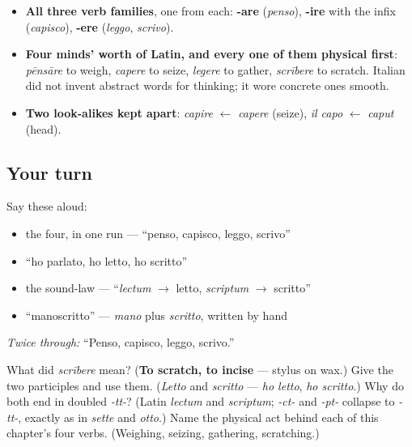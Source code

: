 \begin{grammarlens}[title={What you've built this chapter}]
\begin{itemize}
\raggedright
  \item \textbf{All three verb families}, one from each: \textbf{-are} (\emph{penso}), \textbf{-ire} with the infix (\emph{capisco}), \textbf{-ere} (\emph{leggo}, \emph{scrivo}).
  \item \textbf{Four minds' worth of Latin, and every one of them physical first}: \emph{pēnsāre} to weigh, \emph{capere} to seize, \emph{legere} to gather, \emph{scrībere} to scratch. Italian did not invent abstract words for thinking; it wore concrete ones smooth.
  \item \textbf{Two look-alikes kept apart}: \emph{capire} $\leftarrow$ \emph{capere} (seize), \emph{il capo} $\leftarrow$ \emph{caput} (head).
\end{itemize}
\end{grammarlens}

\subsection*{Your turn}
Say these aloud:

\begin{itemize}
\raggedright
  \item the four, in one run — \textquotedblleft{}penso, capisco, leggo, scrivo\textquotedblright{}
  \item \textquotedblleft{}ho parlato, ho letto, ho scritto\textquotedblright{}
  \item the sound-law — \textquotedblleft{}\emph{lectum} $\to$ letto, \emph{scriptum} $\to$ scritto\textquotedblright{}
  \item \textquotedblleft{}manoscritto\textquotedblright{} — \emph{mano} plus \emph{scritto}, written by hand
\end{itemize}

\emph{Twice through:} \textquotedblleft{}Penso, capisco, leggo, scrivo.\textquotedblright{}

\begin{tcolorbox}[breakable,colback=teal!4,colframe=teal!35!black,title={Before you move on}]
What did \emph{scrībere} mean? (\textbf{To scratch, to incise} — stylus on wax.) Give the two participles and use them. (\emph{Letto} and \emph{scritto} — \emph{ho letto}, \emph{ho scritto}.) Why do both end in doubled \emph{-tt-}? (Latin \emph{lectum} and \emph{scriptum}; \emph{-ct-} and \emph{-pt-} collapse to \emph{-tt-}, exactly as in \emph{sette} and \emph{otto}.) Name the physical act behind each of this chapter's four verbs. (Weighing, seizing, gathering, scratching.)
\end{tcolorbox}
